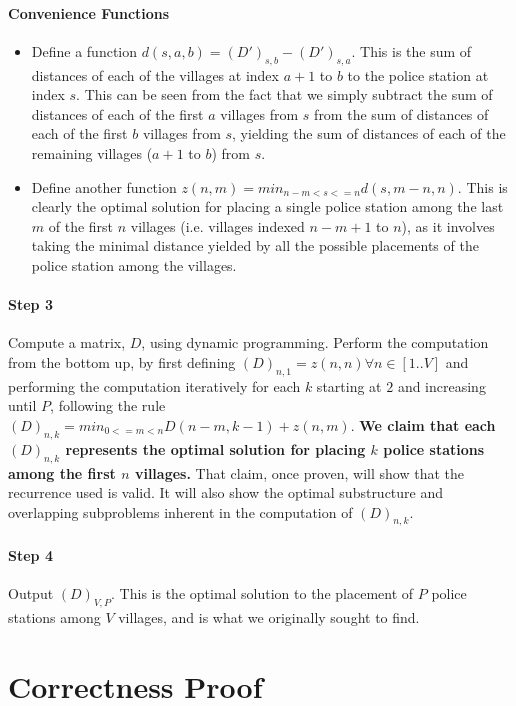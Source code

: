 \documentclass[twocolumn]{article}
\begin{document}
		\paragraph{Convenience Functions}
		\begin{itemize}
			\item Define a function $d(s, a, b) = (D')_{s, b} - (D')_{s, a}$. This is the sum of distances of each of the villages at index $a+1$ to $b$ to the police station at index $s$. This can be seen from the fact that we simply subtract the sum of distances of each of the first $a$ villages from $s$ from the sum of distances of each of the first $b$ villages from $s$, yielding the sum of distances of each of the remaining villages ($a+1$ to $b$) from $s$.
			\item Define another function $z(n, m) = min_{n-m < s <= n}{d(s, m-n, n)}$. This is clearly the optimal solution for placing a single police station among the last $m$ of the first $n$ villages (i.e. villages indexed $n-m+1$ to $n$), as it involves taking the minimal distance yielded by all the possible placements of the police station among the villages.
		\end{itemize}
		
		\paragraph{Step 3}
		Compute a matrix, $D$, using dynamic programming. Perform the computation from the bottom up, by first defining $(D)_{n, 1} = z(n, n) \forall n \in [1..V]$ and performing the computation iteratively for each $k$ starting at $2$ and increasing until $P$, following the rule $(D)_{n, k} = min_{0 <= m < n}{D(n-m, k-1) + z(n, m)}$. \textbf{We claim that each $(D)_{n, k}$ represents the optimal solution for placing $k$ police stations among the first $n$ villages.} That claim, once proven, will show that the recurrence used is valid. It will also show the optimal substructure and overlapping subproblems inherent in the computation of $(D)_{n, k}$.
		
		\paragraph{Step 4}
		Output $(D)_{V, P}$. This is the optimal solution to the placement of $P$ police stations among $V$ villages, and is what we originally sought to find.
			
	
	\section{Correctness Proof}
\end{document}
